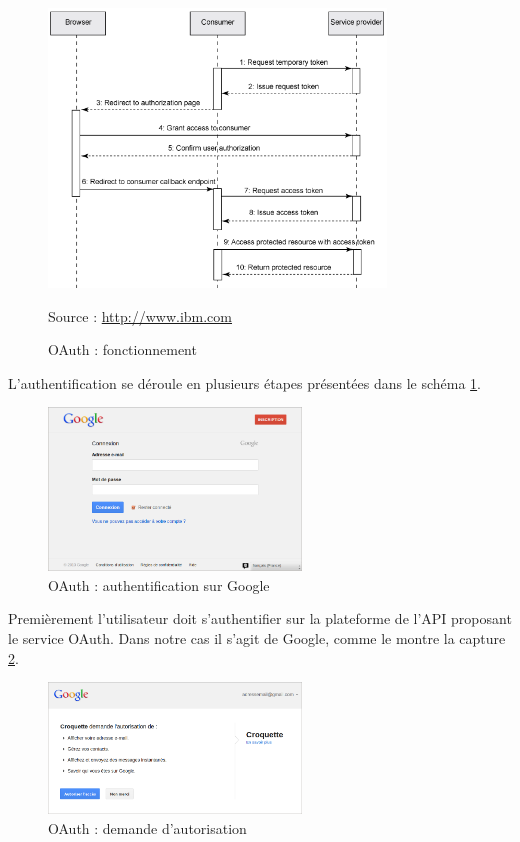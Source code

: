 \begin{figure}[!h]
	\center
	\includegraphics[width=0.8\textwidth]{img/OAuth_fonctionnement.png}
	\caption{OAuth : fonctionnement}
	Source : \href{http://www.ibm.com/developerworks/web/library/wa-oauthsupport/ThreeLeggedOAuthDance.gif}{http://www.ibm.com}
	\label{OAuth_fonctionnement}
\end{figure}

L'authentification se déroule en plusieurs étapes présentées dans le schéma \ref{OAuth_fonctionnement}.
\\


\begin{figure}[!h]
	\center
	\includegraphics[width=0.6\textwidth]{img/OAuth_authentificationGoogle.png}
	\caption{OAuth : authentification sur Google}
	\label{OAuth_authentificationGoogle}
\end{figure}

Premièrement l'utilisateur doit s'authentifier sur la plateforme de l'API proposant le service OAuth.
Dans notre cas il s'agit de Google, comme le montre la capture \ref{OAuth_authentificationGoogle}.
\\


\begin{figure}[!h]
	\center
	\includegraphics[width=0.6\textwidth]{img/OAuth_demandeAutorisations.png}
	\caption{OAuth : demande d'autorisation}
	\label{OAuth_demandeAutorisations}
\end{figure}

